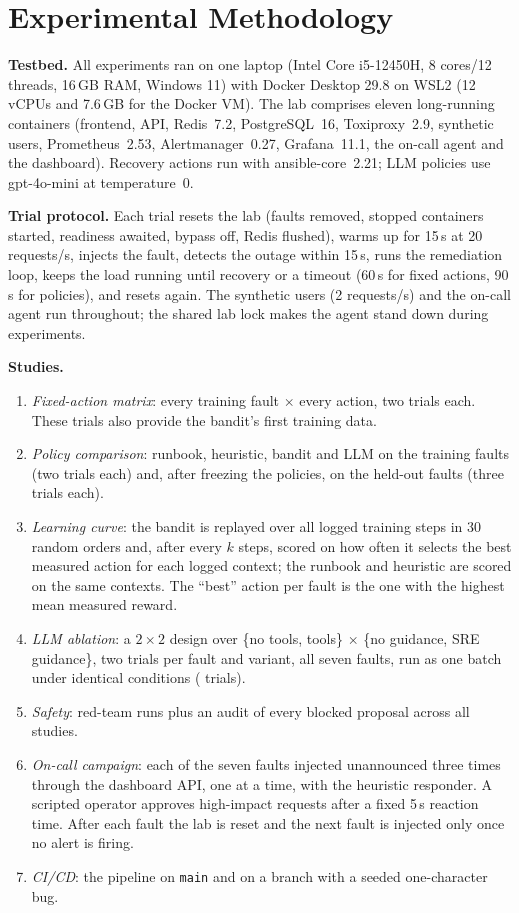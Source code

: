 \section{Experimental Methodology}
\label{sec:method}
\textbf{Testbed.} All experiments ran on one laptop (Intel Core i5-12450H, 8 cores/12 threads, 16\,GB
RAM, Windows 11) with Docker Desktop 29.8 on WSL2 (12 vCPUs and 7.6\,GB for the Docker VM). The lab
comprises eleven long-running containers (frontend, API, Redis~7.2, PostgreSQL~16, Toxiproxy~2.9,
synthetic users, Prometheus~2.53, Alertmanager~0.27, Grafana~11.1, the on-call agent and the dashboard).
Recovery actions run with ansible-core~2.21; LLM policies use gpt-4o-mini at temperature~0.

\textbf{Trial protocol.} Each trial resets the lab (faults removed, stopped containers started,
readiness awaited, bypass off, Redis flushed), warms up for 15\,s at 20 requests/s, injects the fault,
detects the outage within 15\,s, runs the remediation loop, keeps the load running until recovery or
a timeout (60\,s for fixed actions, 90\,s for policies), and resets again. The synthetic users
(2 requests/s) and the on-call agent run throughout; the shared lab lock makes the agent stand down
during experiments.

\textbf{Studies.}
\begin{enumerate}
\item \emph{Fixed-action matrix}: every training fault $\times$ every action, two trials each. These
  trials also provide the bandit's first training data.
\item \emph{Policy comparison}: runbook, heuristic, bandit and LLM on the training faults (two
  trials each) and, after freezing the policies, on the held-out faults (three trials each).
\item \emph{Learning curve}: the bandit is replayed over all logged training steps in 30 random
  orders and, after every $k$ steps, scored on how often it selects the best measured action for each
  logged context; the runbook and heuristic are scored on the same contexts. The ``best'' action per
  fault is the one with the highest mean measured reward.
\item \emph{LLM ablation}: a $2\times2$ design over \{no tools, tools\} $\times$ \{no guidance, SRE
  guidance\}, two trials per fault and variant, all seven faults, run as one batch under identical
  conditions (\nAblation{} trials).
\item \emph{Safety}: red-team runs plus an audit of every blocked proposal across all studies.
\item \emph{On-call campaign}: each of the seven faults injected unannounced three times through the
  dashboard API, one at a time, with the heuristic responder. A scripted operator approves high-impact
  requests after a fixed 5\,s reaction time. After each fault the lab is reset and the next fault is
  injected only once no alert is firing.
\item \emph{CI/CD}: the pipeline on \texttt{main} and on a branch with a seeded one-character bug.
\end{enumerate}

